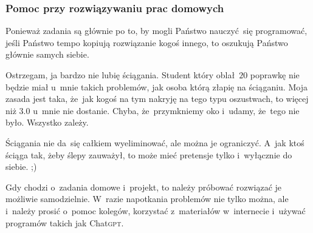\documentclass[10pt,t]{beamer}
\begin{document}
\begin{frame}
  \frametitle{Pomoc przy rozwiązywaniu prac domowych}





  Ponieważ zadania są głównie po to, by mogli Państwo nauczyć~się
  programować, jeśli Państwo tempo kopiują rozwiązanie kogoś innego,
  to oszukują Państwo głównie samych siebie.

  Ostrzegam, ja bardzo \alert{nie lubię} ściągania. Student który
  oblał~$20$ poprawkę nie będzie miał u~mnie takich problemów, jak osoba
  którą złapię na ściąganiu. Moja zasada jest taka, że~jak kogoś na tym
  nakryję na tego typu oszustwach, to więcej niż $3.0$ u~mnie
  \alert{nie dostanie}. Chyba, że~przymkniemy oko i~udamy, że~tego nie było.
  Wszystko zależy.

  Ściągania nie da~się całkiem wyeliminować, ale można je ograniczyć.
  A~jak ktoś ściąga tak, żeby ślepy zauważył, to może mieć pretensje tylko
  i~wyłącznie do siebie. ;)

  Gdy chodzi o~zadania domowe i~projekt, to należy próbować rozwiązać je
  możliwie samodzielnie. W~razie napotkania problemów nie tylko można,
  ale i~\alert{należy} prosić o~pomoc kolegów, korzystać z~materiałów
  w~internecie i~używać programów takich jak Chat\textsc{gpt}.



\end{frame}
\end{document}
